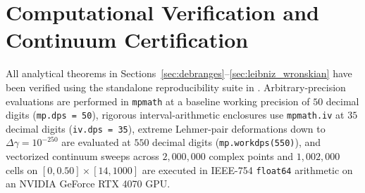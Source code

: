 \documentclass[11pt,reqno,a4paper]{amsart}
\theoremstyle{plain}
\theoremstyle{definition}
\theoremstyle{remark}
\numberwithin{equation}{section}
\begin{document}
\section{Computational Verification and Continuum Certification}\label{sec:verification}

All analytical theorems in Sections~\ref{sec:debranges}--\ref{sec:leibniz_wronskian} have been verified using the standalone reproducibility suite in . Arbitrary-precision evaluations are performed in \texttt{mpmath} at a baseline working precision of $50$ decimal digits (\texttt{mp.dps = 50}), rigorous interval-arithmetic enclosures use \texttt{mpmath.iv} at $35$ decimal digits (\texttt{iv.dps = 35}), extreme Lehmer-pair deformations down to $\Delta\gamma = 10^{-250}$ are evaluated at $550$ decimal digits (\texttt{mp.workdps(550)}), and vectorized continuum sweeps across $2{,}000{,}000$ complex points and $1{,}002{,}000$ cells on $[0,0.50]\times[14,1000]$ are executed in IEEE-754 \texttt{float64} arithmetic on an NVIDIA GeForce RTX 4070 GPU.
\end{document}
